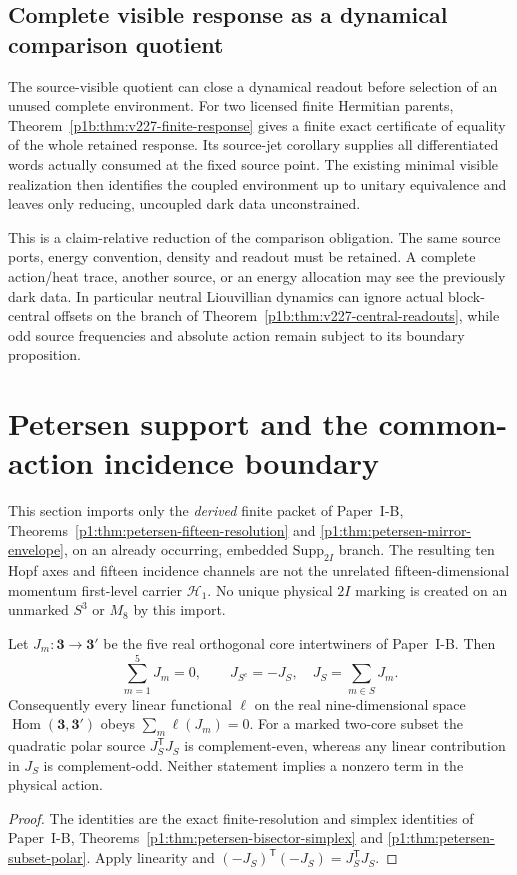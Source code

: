 \documentclass[12pt,a4paper]{article}
\begin{document}
\subsection{Complete visible response as a dynamical comparison quotient}
\label{p3a:sec:v227-visible-dynamics}
The source-visible quotient can close a dynamical readout before selection
of an unused complete environment. For two licensed finite Hermitian
parents, Theorem~\ref{p1b:thm:v227-finite-response} gives a finite exact
certificate of equality of the whole retained response. Its source-jet
corollary supplies all differentiated words actually consumed at the fixed
source point. The existing minimal visible realization then identifies the
coupled environment up to unitary equivalence and leaves only reducing,
uncoupled dark data unconstrained.

This is a claim-relative reduction of the comparison obligation. The same
source ports, energy convention, density and readout must be retained.
A complete action/heat trace, another source, or an energy allocation may
see the previously dark data. In particular neutral Liouvillian dynamics
can ignore actual block-central offsets on the branch of
Theorem~\ref{p1b:thm:v227-central-readouts}, while odd source frequencies
and absolute action remain subject to its boundary proposition.




\section{Petersen support and the common-action incidence boundary}
\label{p3a:sec:v319-petersen-action}
This section imports only the \emph{derived} finite packet of Paper~I-B,
Theorems~\ref{p1:thm:petersen-fifteen-resolution} and
\ref{p1:thm:petersen-mirror-envelope}, on an already occurring, embedded
$\mathrm{Supp}_{2I}$ branch.  The resulting ten Hopf axes and fifteen
incidence channels are not the unrelated fifteen-dimensional momentum
first-level carrier $\mathcal H_1$.  No unique physical $2I$ marking is
created on an unmarked $S^3$ or $M_8$ by this import.

\begin{proposition}
\label{p3a:prop:v319-petersen-marked-jet}
Let $J_m:\mathbf3\to\mathbf3'$ be the five real orthogonal
core intertwiners of Paper~I-B.  Then
\[
  \sum_{m=1}^5J_m=0,\qquad
  J_{S^c}=-J_S,\quad J_S=\sum_{m\in S}J_m.
\]
Consequently every linear functional $\ell$ on the real nine-dimensional
space $\operatorname{Hom}(\mathbf3,\mathbf3')$ obeys
$\sum_m\ell(J_m)=0$.  For a marked two-core subset the quadratic
polar source $J_S^{\mathsf T}J_S$ is complement-even, whereas any
linear contribution in $J_S$ is complement-odd.  Neither statement
implies a nonzero term in the physical action.
\end{proposition}
\begin{proof}
The identities are the exact finite-resolution and simplex identities
of Paper~I-B, Theorems~\ref{p1:thm:petersen-bisector-simplex} and
\ref{p1:thm:petersen-subset-polar}.  Apply linearity and
$( -J_S)^{\mathsf T}(-J_S)=J_S^{\mathsf T}J_S$.
\end{proof}
\end{document}
